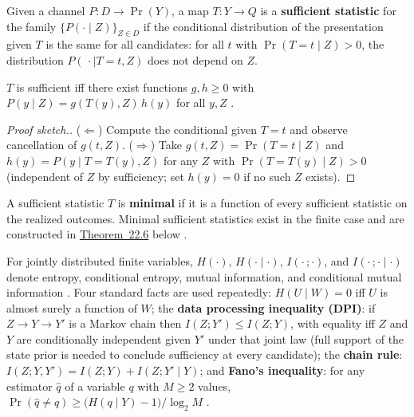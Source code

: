 
Given a channel \(P : D \to \Pr(Y)\), a map \(T : Y \to Q\) is a \textbf{sufficient statistic} for the family \(\{P(\cdot \mid Z)\}_{Z \in D}\) if the conditional distribution of the presentation given \(T\) is the same for all candidates: for all \(t\) with \(\Pr(T = t \mid Z) > 0\), the distribution \(P(\,\cdot \mid T = t, Z)\) does not depend on \(Z\).

\begin{thmplain}

\(T\) is sufficient iff there exist functions \(g, h \ge 0\) with \(P(y \mid Z) = g(T(y), Z)\, h(y)\) for all \(y, Z\) \autocite{halmos1949}.
\end{thmplain}

\begin{proof}[Proof sketch.]

(\(\Leftarrow\)) Compute the conditional given \(T = t\) and observe cancellation of \(g(t, Z)\). (\(\Rightarrow\)) Take \(g(t, Z) = \Pr(T = t \mid Z)\) and \(h(y) = P(y \mid T = T(y), Z)\) for any \(Z\) with \(\Pr(T = T(y) \mid Z) > 0\) (independent of \(Z\) by sufficiency; set \(h(y) = 0\) if no such \(Z\) exists).
\end{proof}

A sufficient statistic \(T\) is \textbf{minimal} if it is a function of every sufficient statistic on the realized outcomes. Minimal sufficient statistics exist in the finite case and are constructed in \hyperlink{stmt:22.6}{Theorem~22.6} below \autocite{lehmann1950,bahadur1954}.


For jointly distributed finite variables, \(H(\cdot)\), \(H(\cdot \mid \cdot)\), \(I(\cdot\,;\cdot)\), and \(I(\cdot\,;\cdot \mid \cdot)\) denote entropy, conditional entropy, mutual information, and conditional mutual information \autocite{cover2006}. Four standard facts are used repeatedly: \(H(U \mid W) = 0\) iff \(U\) is almost surely a function of \(W\); the \textbf{data processing inequality (DPI)}: if \(Z \to Y \to Y'\) is a Markov chain then \(I(Z; Y') \le I(Z; Y)\), with equality iff \(Z\) and \(Y\) are conditionally independent given \(Y'\) under that joint law (full support of the state prior is needed to conclude sufficiency at every candidate); the \textbf{chain rule}: \(I(Z; Y, Y') = I(Z; Y) + I(Z; Y' \mid Y)\); and \textbf{Fano's inequality}: for any estimator \(\widehat{q}\) of a variable \(q\) with \(M \ge 2\) values, \(\Pr(\widehat q \ne q) \ge \big(H(q \mid Y) - 1\big)/\log_2 M\) \autocite{cover2006}.

